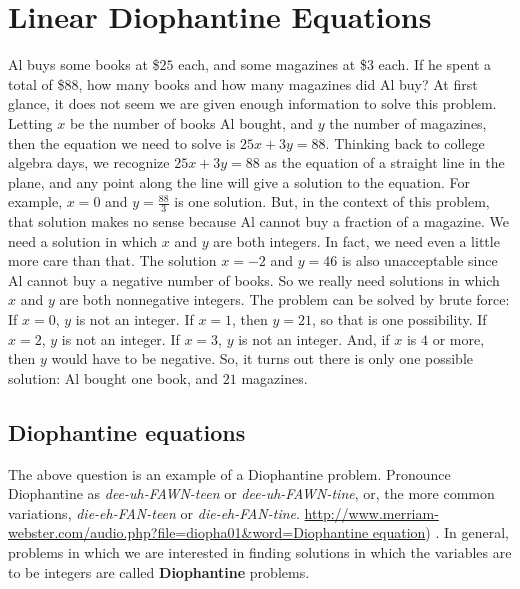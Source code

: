 \chapter{Linear Diophantine Equations}\label{chap:lin dio eqns}

 
Al buys some books at \$$25$ each, and some magazines at \$$3$ each. If he spent 
a total of \$$88$, how many books and how many magazines did Al buy?
At first glance, it does not seem we are given enough information to solve
this problem. Letting $x$ be the number of books Al bought, and $y$ the number
of magazines, then the equation we need to solve is $25x+3y = 88$. 
Thinking back to college algebra days, we recognize $25x+3y = 88$ as the
equation of a straight line in the plane, and any point along the line
will give a solution to the equation. For example, 
$x=0$ and $y = \frac{88}{3}$ is one solution. But, in the context of 
this problem, that solution makes no sense because Al cannot buy a fraction
of a magazine. We need a solution in which $x$ and $y$ are both integers.
In fact, we need even a little more care than that. The solution 
$x=-2$ and $y = 46$ is also unacceptable since Al cannot buy a negative number
of books. So we really need solutions in which
$x$ and $y$ are both nonnegative integers. The problem can be solved by brute
force: If $x= 0$, $y$ is not an integer. If $x=1$, then $y = 21$, so
that is one possibility. If $x=2$, $y$ is not an integer. If $x=3$, $y$ is 
not an integer. And, if $x$ is $4$ or more, then $y$ would have to be
negative. So, it turns out there is only one possible solution:
Al bought one book, and $21$ magazines.

\section{Diophantine  equations}
The above question is an example of a Diophantine problem. Pronounce 
Diophantine as
\textit{dee-uh-FAWN-teen} or \textit{dee-uh-FAWN-tine}, or, the more common 
variations, 
\textit{die-eh-FAN-teen} or \textit{die-eh-FAN-tine}.
\url{http://www.merriam-webster.com/audio.php?file=diopha01&word=Diophantine equation})
. In general,
problems in which we are interested in finding solutions in which the
variables are to be integers are called {\bf Diophantine} problems.


